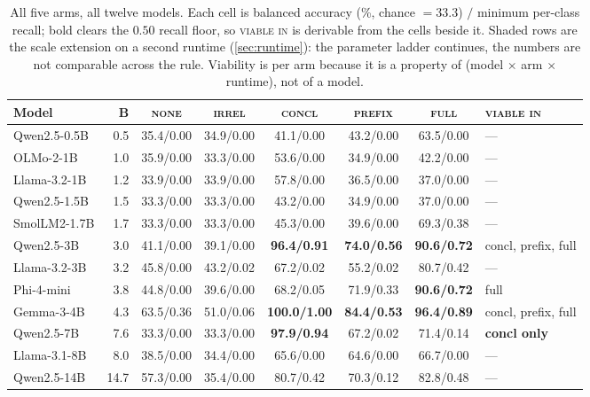 \documentclass[10pt,twocolumn]{article}
\begin{document}
\begin{table}[tb]
\centering\small
\caption{All five arms, all twelve models. Each cell is balanced accuracy
(\%, chance $=33.3$) $/$ minimum per-class recall; bold clears the $0.50$ recall
floor, so \textsc{viable in} is derivable from the cells beside it. Shaded rows
are the scale extension on a second runtime (\cref{sec:runtime}): the parameter
ladder continues, the numbers are not comparable across the rule. Viability is
per arm because it is a property of (model $\times$ arm $\times$ runtime), not of
a model.}
\label{tab:models}
\begin{tabular}{lrccccc@{\hskip 1em}l}
\toprule
Model & B & \textsc{none} & \textsc{irrel} & \textsc{concl} & \textsc{prefix} & \textsc{full} & \textsc{viable in} \\
\midrule
Qwen2.5-0.5B &  0.5 & 35.4/0.00 & 34.9/0.00 & 41.1/0.00 & 43.2/0.00 & 63.5/0.00 & --- \\
OLMo-2-1B    &  1.0 & 35.9/0.00 & 33.3/0.00 & 53.6/0.00 & 34.9/0.00 & 42.2/0.00 & --- \\
Llama-3.2-1B &  1.2 & 33.9/0.00 & 33.9/0.00 & 57.8/0.00 & 36.5/0.00 & 37.0/0.00 & --- \\
Qwen2.5-1.5B &  1.5 & 33.3/0.00 & 33.3/0.00 & 43.2/0.00 & 34.9/0.00 & 37.0/0.00 & --- \\
SmolLM2-1.7B &  1.7 & 33.3/0.00 & 33.3/0.00 & 45.3/0.00 & 39.6/0.00 & 69.3/0.38 & --- \\
Qwen2.5-3B   &  3.0 & 41.1/0.00 & 39.1/0.00 & \textbf{96.4/0.91} & \textbf{74.0/0.56} & \textbf{90.6/0.72} & concl, prefix, full \\
Llama-3.2-3B &  3.2 & 45.8/0.00 & 43.2/0.02 & 67.2/0.02 & 55.2/0.02 & 80.7/0.42 & --- \\
Phi-4-mini   &  3.8 & 44.8/0.00 & 39.6/0.00 & 68.2/0.05 & 71.9/0.33 & \textbf{90.6/0.72} & full \\
Gemma-3-4B   &  4.3 & 63.5/0.36 & 51.0/0.06 & \textbf{100.0/1.00} & \textbf{84.4/0.53} & \textbf{96.4/0.89} & concl, prefix, full \\
Qwen2.5-7B   &  7.6 & 33.3/0.00 & 33.3/0.00 & \textbf{97.9/0.94} & 67.2/0.02 & 71.4/0.14 & \textbf{concl only} \\
\midrule
\rowcolor{black!7} Llama-3.1-8B &  8.0 & 38.5/0.00 & 34.4/0.00 & 65.6/0.00 & 64.6/0.00 & 66.7/0.00 & --- \\
\rowcolor{black!7} Qwen2.5-14B  & 14.7 & 57.3/0.00 & 35.4/0.00 & 80.7/0.42 & 70.3/0.12 & 82.8/0.48 & --- \\
\bottomrule
\end{tabular}
\end{table}
\end{document}
